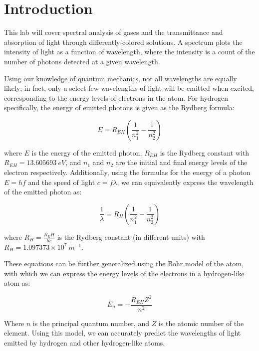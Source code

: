 \section{Introduction}




This lab will cover spectral analysis of gases and the transmittance and absorption of light through differently-colored solutions. A spectrum plots the intensity of light as a function of wavelength, where the intensity is a count of the number of photons detected at a given wavelength.

Using our knowledge of quantum mechanics, not all wavelengths are equally likely; in fact, only a select few wavelengths of light will be emitted when excited, corresponding to the energy levels of electrons in the atom. For hydrogen specifically, the energy of emitted photons is given as the Rydberg formula:

\begin{equation}
   E = R_{EH} \left( \frac{1}{n_1^2} - \frac{1}{n_2^2} \right)
   \label{eq:Rydberg}
\end{equation}

where $E$ is the energy of the emitted photon, $R_{EH}$ is the Rydberg constant with $R_{EH} = 13.605693~eV$, and $n_1$ and $n_2$ are the initial and final energy levels of the electron respectively. Additionally, using the formulas for the energy of a photon $E = hf$ and the speed of light $c = f\lambda$, we can equivalently express the wavelength of the emitted photon as:

\begin{equation}
   \frac{1}{\lambda} = R_{H} \left( \frac{1}{n_1^2} - \frac{1}{n_2^2} \right)
\end{equation}

where $R_{H}=\frac{R_EH}{hc}$ is the Rydberg constant (in different units) with $R_{H} = 1.097373 \times 10^7~m^{-1}$.

These equations can be further generalized using the Bohr model of the atom, with which we can express the energy levels of the electrons in a hydrogen-like atom as:

\begin{equation}
   E_n = -\frac{R_{EH}Z^2}{n^2}
\end{equation}



Where $n$ is the principal quantum number, and $Z$ is the atomic number of the element. Using this model, we can accurately predict the wavelengths of light emitted by hydrogen and other hydrogen-like atoms.

